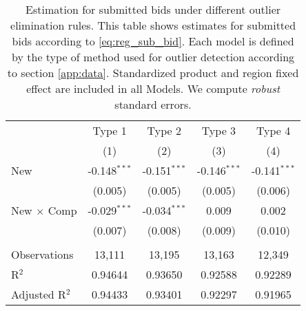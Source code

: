 
\begin{table}[H]
   \centering
   \begin{tabular}{lcccc}
      \toprule
                                & Type 1         & Type 2         & Type 3         & Type 4 \\   
                                & (1)            & (2)            & (3)            & (4)\\  
      \midrule 
      New                       & -0.148$^{***}$ & -0.151$^{***}$ & -0.146$^{***}$ & -0.141$^{***}$\\   
                                & (0.005)        & (0.005)        & (0.005)        & (0.006)\\   
      New $\times$ Comp  & -0.029$^{***}$ & -0.034$^{***}$ & 0.009          & 0.002\\   
                                & (0.007)        & (0.008)        & (0.009)        & (0.010)\\   
       \\
      Observations              & 13,111         & 13,195         & 13,163         & 12,349\\  
      R$^2$                     & 0.94644        & 0.93650        & 0.92588        & 0.92289\\  
      Adjusted R$^2$            & 0.94433        & 0.93401        & 0.92297        & 0.91965\\  
      \bottomrule
   \end{tabular}
   
   \par \raggedright 
   \caption{Estimation for submitted bids under different outlier elimination rules. This table shows estimates for submitted bids according to  \eqref{eq:reg_sub_bid}. Each model is defined by the type of method used for outlier detection according to section \ref{app:data}. Standardized product and region fixed effect are included in all Models. We compute \textit{robust} standard errors.}
\end{table}


